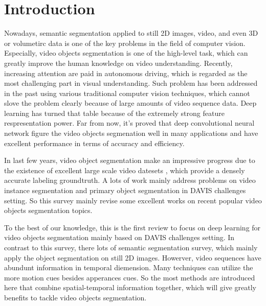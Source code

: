 \section{Introduction}
Nowadays, semantic segmentation applied to still 2D images, video, and even 3D or volumetirc data is one of the key problems in the field of computer vision.
Especially, video objects segmentation is one of the high-level task, which can greatly improve the human knowledge on video understanding.
Recently, increasing attention are paid in autonomous driving\cite{geiger2012we, cordts2016cityscapes, ess2009segmentation}, 
which is regarded as the most challenging part in visual understanding. 
Such problem has been addressed in the past using various traditional computer vision techniques, which cannot slove the problem clearly because of large amounts of video sequence data.
Deep learning has turned that table because of the extremely strong feature respresentation power. 
Far from now, it's proved that deep convolutional neural network \cite{farabet2013learning, ning2005toward} figure the video objects segmenation well in many applications and have excellent
performance in terms of accuracy and efficiency. 

In last few years, video object segmentation make an impressive progress due to the existence of excellent large scale video datesets \cite{DAVIS2016, SegTrack, Youtube}, which provide a densely
accurate labeling groundtruth. A lots of work mainly address problems on video instance segmentation and primary object segmentation in DAVIS challenges setting. So this survey mainly revise some 
excellent works on recent popular video objects segmentation topics.

To the best of our knowledge, this is the first review to focus on deep learning for video objects segmentation mainly based on DAVIS challenges setting. In contrast to this survey, there lots of 
semantic segmentation survey, which mainly apply the object segmentation on still 2D images. Howerver, video sequences have abundunt information in temporal diemension. Many techniques can utilize
the more motion cues besides apperances cues. So the most methods are introduced here that combine spatial-temporal information together, which will give greatly benefits to tackle video objects 
segmentation. 

